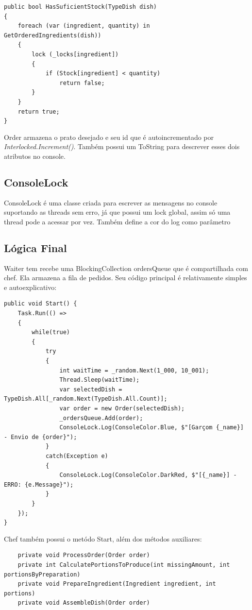 \documentclass[
	12pt,				%
	oneside,			%
	a4paper,			%
	english,			%
	brazil,				%
	]{abntex2}
\begin{document}
{\begin{lstlisting}
public bool HasSuficientStock(TypeDish dish)
{
    foreach (var (ingredient, quantity) in GetOrderedIngredients(dish))
    {
        lock (_locks[ingredient])
        {
            if (Stock[ingredient] < quantity)
                return false;
        }
    }
    return true;
}
\end{lstlisting}

Order armazena o prato desejado e seu id que é autoincrementado por \textit{Interlocked.Increment()}. Também possui um ToString para descrever esses dois atributos no console.

\subsection{ConsoleLock}

ConsoleLock é uma classe criada para escrever as mensagens no console suportando as threads sem erro, já que possui um lock global, assim só uma thread pode a acessar por vez. Também define a cor do log como parâmetro

\subsection{Lógica Final}

Waiter tem recebe uma BlockingCollection ordersQueue que é compartilhada com chef. Ela armazena a fila de pedidos. Seu código principal é relativamente simples e autoexplicativo:

\begin{lstlisting}
public void Start() {
    Task.Run(() =>
    {
        while(true)
        {
            try
            {
                int waitTime = _random.Next(1_000, 10_001);
                Thread.Sleep(waitTime);
                var selectedDish = TypeDish.All[_random.Next(TypeDish.All.Count)];
                var order = new Order(selectedDish);
                _ordersQueue.Add(order);
                ConsoleLock.Log(ConsoleColor.Blue, $"[Garçom {_name}] - Envio de {order}");
            }
            catch(Exception e)
            {
                ConsoleLock.Log(ConsoleColor.DarkRed, $"[{_name}] - ERRO: {e.Message}");
            }
        }
    });
}
\end{lstlisting}

Chef também possui o metódo Start, além dos métodos auxiliares:
\begin{lstlisting}
    private void ProcessOrder(Order order)
    private int CalculatePortionsToProduce(int missingAmount, int portionsByPreparation)
    private void PrepareIngredient(Ingredient ingredient, int portions)
    private void AssembleDish(Order order)
\end{lstlisting}

}
\end{document}
